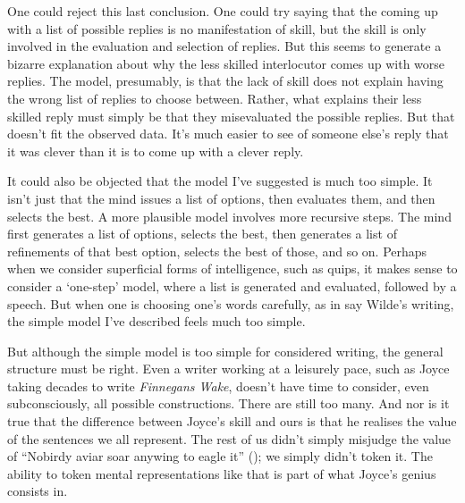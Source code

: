 \documentclass[
  11pt,
  letterpaper,
  DIV=11,
  numbers=noendperiod,
  oneside]{scrartcl}
\begin{document}
One could reject this last conclusion. One could try saying that the
coming up with a list of possible replies is no manifestation of skill,
but the skill is only involved in the evaluation and selection of
replies. But this seems to generate a bizarre explanation about why the
less skilled interlocutor comes up with worse replies. The model,
presumably, is that the lack of skill does not explain having the wrong
list of replies to choose between. Rather, what explains their less
skilled reply must simply be that they misevaluated the possible
replies. But that doesn't fit the observed data. It's much easier to see
of someone else's reply that it was clever than it is to come up with a
clever reply.

It could also be objected that the model I've suggested is much too
simple. It isn't just that the mind issues a list of options, then
evaluates them, and then selects the best. A more plausible model
involves more recursive steps. The mind first generates a list of
options, selects the best, then generates a list of refinements of that
best option, selects the best of those, and so on. Perhaps when we
consider superficial forms of intelligence, such as quips, it makes
sense to consider a `one-step' model, where a list is generated and
evaluated, followed by a speech. But when one is choosing one's words
carefully, as in say Wilde's writing, the simple model I've described
feels much too simple.

But although the simple model is too simple for considered writing, the
general structure must be right. Even a writer working at a leisurely
pace, such as Joyce taking decades to write \emph{Finnegans Wake},
doesn't have time to consider, even subconsciously, all possible
constructions. There are still too many. And nor is it true that the
difference between Joyce's skill and ours is that he realises the value
of the sentences we all represent. The rest of us didn't simply misjudge
the value of ``Nobirdy aviar soar anywing to eagle it''
(); we simply didn't token
it. The ability to token mental representations like that is part of
what Joyce's genius consists in.
\end{document}

